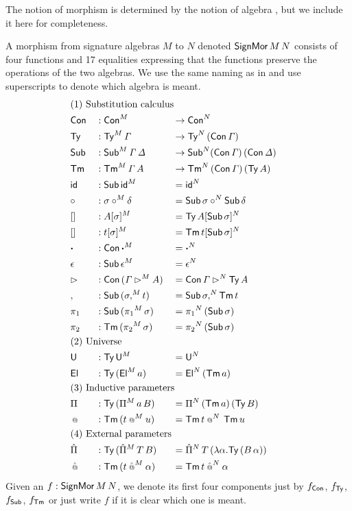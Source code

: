 \documentclass[a4paper,UKenglish,cleveref, autoref]{lipics-v2019}
\begin{document}
The notion of morphism is determined by the notion of algebra
\cite{large_inf_qiit}, but we include it here for completeness.
\begin{definition}\label{def:morphism}
  A morphism from signature algebras $M$ to $N$ denoted
  $\mathsf{SignMor}\,M\,N$ consists of four functions and 17 equalities
  expressing that the functions preserve the operations of the two
  algebras. We use the same naming as in  and use
  superscripts to denote which algebra is meant.
\begin{alignat*}{5}
  & \rlap{(1) Substitution calculus} \\
  & \Con && : \Con^M && \ra\Con^N \\
  & \Ty  && : \Ty^M\,\GG && \ra\Ty^N\,(\Con\,\GG) \\
  & \Sub  && : \Sub^M\,\GG\,\GD && \ra\Sub^N(\Con\,\GG)\,(\Con\,\GD) \\
  & \Tm  && : \Tm^M\,\GG\,A && \ra\Tm^N\,(\Con\,\GG)\,(\Ty\,A) \\
  & \id && : \Sub\,\id^M && = \id^N \\
  & {\circ} && : \sigma\circ^M\delta && = \Sub\,\sigma\circ^N\Sub\,\delta \\
  & [] && : A[\sigma]^M && = \Ty\,A[\Sub\,\sigma]^N \\
  & [] && : t[\sigma]^M && = \Tm\,t[\Sub\,\sigma]^N \\
  & \boldsymbol{\cdot} && : \Con\,\boldsymbol{\cdot}^M && = \boldsymbol{\cdot}^N \\
  & \epsilon && : \Sub\,\epsilon^M && = \epsilon^N \\
  & \ext && : \Con\,(\GG\ext^M A) && = \Con\,\GG\ext^N\Ty\,A \\
  & , && : \Sub\,(\sigma,^M t) && = \Sub\,\sigma ,^N\Tm\,t \\
  & \pi_1 && : \Sub\,({\pi_1}^M\,\sigma) && = {\pi_1}^N\,(\Sub\,\sigma) \\
  & \pi_2 && : \Tm\,({\pi_2}^M\,\sigma) && = {\pi_2}^N\,(\Sub\,\sigma) \\
  & \rlap{(2) Universe} \\
  & \U && : \Ty\,\U^M && = \U^N \\
  & \El && : \Ty\,(\El^M\,a) && = \El^N\,(\Tm\,a) \\
  & \rlap{(3) Inductive parameters} \\
  & \Pi && : \Ty\,(\Pi^M\,a\,B) && = \Pi^N\,(\Tm\,a)\,(\Ty\,B) \\
  & \oldapp && : \Tm\,(t\mathbin{{\oldapp}^M} u) && = \Tm\,t\mathbin{{\oldapp}^N}\,\Tm\,u \\
  & \rlap{(4) External parameters} \\
  & \Pim && : \Ty\,(\Pim^M\,T\,B) && = \Pim^N\,T\,(\lambda\alpha.\Ty\,(B\,\alpha)) \\
  & \appm && : \Tm\,(t\mathbin{{\appm}^M}\alpha) && = \Tm\,t\mathbin{{\appm}^N}\alpha
\end{alignat*}
Given an $f:\mathsf{SignMor}\,M\,N$, we denote its first four components just
by $f_{\mathsf{Con}}$, $f_{\mathsf{Ty}}$, $f_{\mathsf{Sub}}$, $f_{\mathsf{Tm}}$ or just write $f$ if it is
clear which one is meant.
\end{definition}
\end{document}
